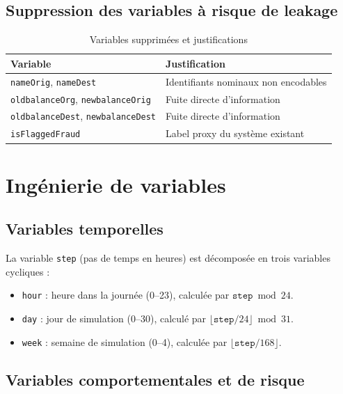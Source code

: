 \documentclass[12pt,a4paper,twoside]{report}
\begin{document}
\subsection{Suppression des variables à risque de leakage}

\begin{table}[H]
\centering
\caption{Variables supprimées et justifications}
\label{tab:cols_dropped}
\begin{tabular}{ll}
\toprule
\textbf{Variable} & \textbf{Justification} \\
\midrule
\texttt{nameOrig}, \texttt{nameDest}           & Identifiants nominaux non encodables \\
\texttt{oldbalanceOrg}, \texttt{newbalanceOrig} & Fuite directe d'information \\
\texttt{oldbalanceDest}, \texttt{newbalanceDest} & Fuite directe d'information \\
\texttt{isFlaggedFraud}                         & Label proxy du système existant \\
\bottomrule
\end{tabular}
\end{table}

\section{Ingénierie de variables}

\subsection{Variables temporelles}

La variable \texttt{step} (pas de temps en heures) est décomposée en trois variables cycliques :

\begin{itemize}
  \item \texttt{hour} : heure dans la journée (0--23), calculée par $\texttt{step} \bmod 24$.
  \item \texttt{day} : jour de simulation (0--30), calculé par $\lfloor \texttt{step} / 24 \rfloor \bmod 31$.
  \item \texttt{week} : semaine de simulation (0--4), calculée par $\lfloor \texttt{step} / 168 \rfloor$.
\end{itemize}

\subsection{Variables comportementales et de risque}
\end{document}
